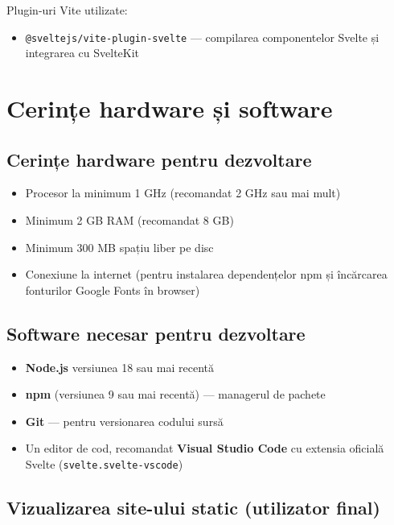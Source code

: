 \documentclass[12pt,a4paper]{report}
\begin{document}
Plugin-uri Vite utilizate:

\begin{itemize}
  \item \texttt{@sveltejs/vite-plugin-svelte} --- compilarea componentelor
        Svelte și integrarea cu SvelteKit
\end{itemize}

\chapter{Cerințe hardware și software}

\section{Cerințe hardware pentru dezvoltare}

\begin{itemize}
  \item Procesor la minimum 1 GHz (recomandat 2 GHz sau mai mult)
  \item Minimum 2 GB RAM (recomandat 8 GB)
  \item Minimum 300 MB spațiu liber pe disc
  \item Conexiune la internet (pentru instalarea dependențelor npm și
        încărcarea fonturilor Google Fonts în browser)
\end{itemize}

\section{Software necesar pentru dezvoltare}

\begin{itemize}
  \item \textbf{Node.js} versiunea 18 sau mai recentă
  \item \textbf{npm} (versiunea 9 sau mai recentă) --- managerul de pachete
  \item \textbf{Git} --- pentru versionarea codului sursă
  \item Un editor de cod, recomandat \textbf{Visual Studio Code} cu extensia
        oficială Svelte (\texttt{svelte.svelte-vscode})
\end{itemize}

\section{Vizualizarea site-ului static (utilizator final)}
\end{document}
